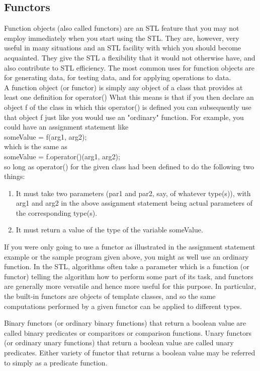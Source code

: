 \subsection{Functors}
Function objects (also called functors) are an STL feature that you may not employ immediately when you start using the STL. They are, however, very useful in many situations and an STL facility with which you should become acquainted. They give the STL a flexibility that it would not otherwise have, and also contribute to STL efficiency. The most common uses for function objects are for generating data, for testing data, and for applying operations to data.\\

A function object (or functor) is simply any object of a class that provides at least one definition for operator() What this means is that if you then declare an object f of the class in which this operator() is defined you can subsequently use that object f just like you would use an "ordinary" function. For example, you could have an assignment statement like\\

someValue = f(arg1, arg2);\\
which is the same as\\

someValue = f.operator()(arg1, arg2);\\
so long as operator() for the given class had been defined to do the following two things:
\begin{enumerate}
	\item It must take two parameters (par1 and par2, say, of whatever type(s)), with arg1 and arg2 in the above assignment statement being actual parameters of the corresponding type(s).
	\item It must return a value of the type of the variable someValue.
\end{enumerate}
If you were only going to use a functor as illustrated in the assignment statement example or the sample program given above, you might as well use an ordinary function. In the STL, algorithms often take a parameter which is a function (or functor) telling the algorithm how to perform some part of its task, and functors are generally more versatile and hence more useful for this purpose. In particular, the built-in functors are objects of template classes, and so the same computations performed by a given functor can be applied to different types.

Binary functors (or ordinary binary functions) that return a boolean value are called binary predicates or comparitors or comparison functions. Unary functors (or ordinary unary functions) that return a boolean value are called unary predicates. Either variety of functor that returns a boolean value may be referred to simply as a predicate function.

